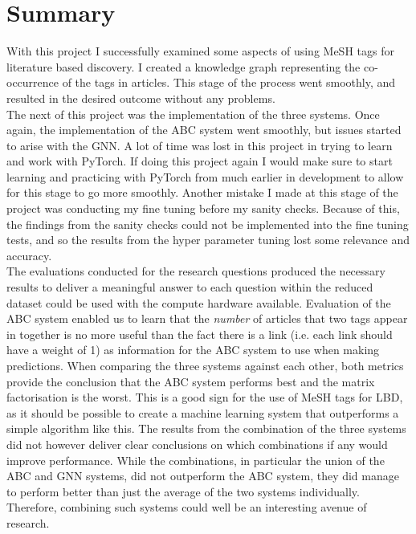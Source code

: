 \documentclass{l4proj}
\begin{document}
\section{Summary}

With this project I successfully examined some aspects of using MeSH tags for literature based discovery. I created a knowledge graph representing the co-occurrence of the tags in articles. This stage of the process went smoothly, and resulted in the desired outcome without any problems. \\

The next of this project was the implementation of the three systems. Once again, the implementation of the ABC system went smoothly, but issues started to arise with the GNN. A lot of time was lost in this project in trying to learn and work with PyTorch. If doing this project again I would make sure to start learning and practicing with PyTorch from much earlier in development to allow for this stage to go more smoothly. Another mistake I made at this stage of the project was conducting my fine tuning before my sanity checks. Because of this, the findings from the sanity checks could not be implemented into the fine tuning tests, and so the results from the hyper parameter tuning lost some relevance and accuracy. \\

The evaluations conducted for the research questions produced the necessary results to deliver a meaningful answer to each question within the reduced dataset could be used with the compute hardware available. Evaluation of the ABC system enabled us to learn that the \textit{number} of articles that two tags appear in together is no more useful than the fact there is a link (i.e. each link should have a weight of 1) as information for the ABC system to use when making predictions. When comparing the three systems against each other, both metrics provide the conclusion that the ABC system performs best and the matrix factorisation is the worst. This is a good sign for the use of MeSH tags for LBD, as it should be possible to create a machine learning system that outperforms a simple algorithm like this. The results from the combination of the three systems did not however deliver clear conclusions on which combinations if any would improve performance. While the combinations, in particular the union of the ABC and GNN systems, did not outperform the ABC system, they did manage to perform better than just the average of the two systems individually. Therefore, combining such systems could well be an interesting avenue of research. \\
\end{document}
